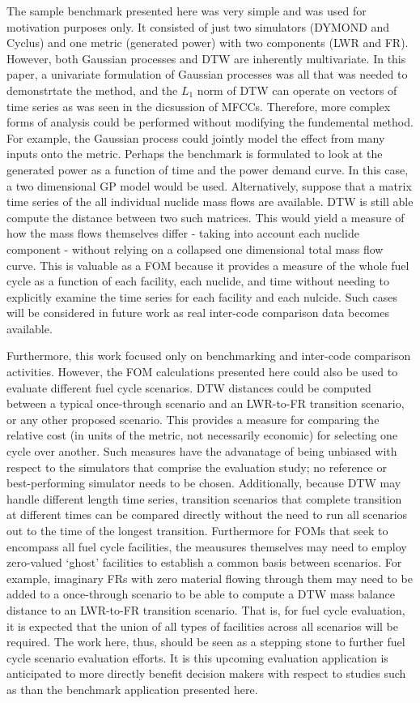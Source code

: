 The sample benchmark presented here was very simple and was used for motivation 
purposes only. It consisted of just
two simulators (DYMOND and Cyclus) and one metric (generated power) with
two components (LWR and FR).  However, both Gaussian processes and DTW
are inherently multivariate. In this paper, a univariate formulation of 
Gaussian processes was all that was needed to demonstrtate the method, and 
the $L_1$ norm of DTW can operate on vectors of time series as was seen 
in the dicsussion of MFCCs. Therefore, more complex forms of analysis could 
be performed without modifying the fundemental method. For example, the Gaussian process could jointly model the 
effect from many inputs onto the metric. Perhaps the benchmark is formulated
to look at the generated power as a function of time and the power demand curve.
In this case, a two dimensional GP model would be used. Alternatively, 
suppose that a matrix time series of the all individual nuclide mass flows 
are available. DTW is still able compute the distance between two 
such matrices. This would yield a measure of how the mass flows themselves
differ - taking into account each nuclide component - without relying on a 
collapsed one dimensional total mass flow curve. 
This is valuable as a FOM because it provides a measure of the whole fuel
cycle as a function of each facility, each nuclide, and time 
without needing to explicitly examine the time series for each facility 
and each nulcide.
Such cases will be considered in
future work as real inter-code comparison data becomes available.

Furthermore, this work focused only on benchmarking and inter-code comparison
activities.
However, the FOM calculations presented here could also be used to evaluate 
different fuel cycle scenarios. DTW distances could be computed between
a typical once-through scenario and an LWR-to-FR transition
scenario, or any other proposed scenario. This provides a measure for 
comparing the relative cost (in units of the metric, not necessarily 
economic) for selecting one cycle over another. 
Such measures have the advanatage of being unbiased with respect to the 
simulators that comprise the evaluation study; no reference or best-performing
simulator needs to be chosen. 
Additionally, because DTW may handle different length time series, 
transition scenarios that complete transition at different times can be 
compared directly without the need to run all scenarios out to the time of 
the longest transition.
Furthermore for FOMs that seek to encompass all fuel cycle facilities,
the meausures themselves may need to employ zero-valued `ghost' 
facilities to establish a common basis between scenarios.  For example, 
imaginary FRs with zero material flowing through them may need to be added 
to a once-through scenario to be able to compute a DTW mass balance distance 
to an LWR-to-FR transition scenario. That is, for fuel cycle evaluation,
it is expected that the union of all types of facilities across all scenarios 
will be required.
The work here, thus, 
should be seen as a stepping stone to further fuel cycle scenario evaluation
efforts. It is this upcoming evaluation application is anticipated to more 
directly benefit decision makers with respect to studies such as 
\cite{wigeland2014nuclear} than the benchmark application presented here.

